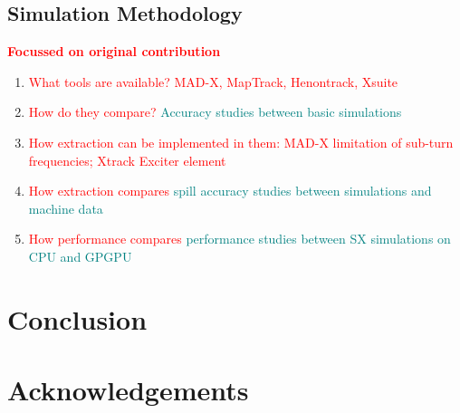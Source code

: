 \documentclass[11pt]{report}
\newcommand\todo[1]{\textcolor{red}{#1}}
\begin{document}
\section{Simulation Methodology}
\todo{\textbf{Focussed on original contribution}}
\begin{enumerate}
    \item \todo{What tools are available? MAD-X, MapTrack, Henontrack, Xsuite}
    \item \todo{How do they compare?} \textcolor{teal}{Accuracy studies between basic simulations}
    \item \todo{How extraction can be implemented in them: MAD-X limitation of sub-turn frequencies; Xtrack Exciter element}
    \item \todo{How extraction compares} \textcolor{teal}{spill accuracy studies between simulations and machine data}
    \item \todo{How performance compares} \textcolor{teal}{performance studies between SX simulations on CPU and GPGPU}
\end{enumerate}

\chapter{Conclusion}

\chapter{Acknowledgements}

 

\end{document}
